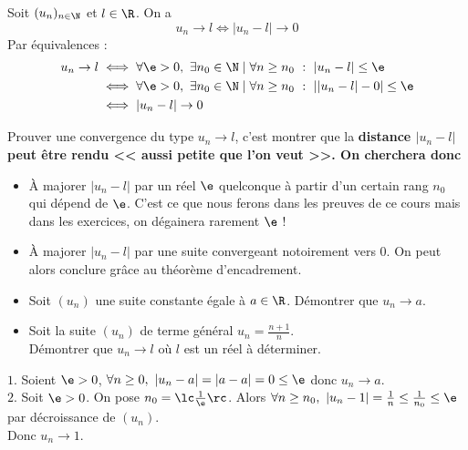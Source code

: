 \documentclass[11pt]{article}
\begin{document}
\begin{prop}{}{}
    Soit $(u_n)_{n\in\N}$ et $l\in\R$. On a
    \begin{equation*}
        u_n \to l \iff |u_n - l| \to 0
    \end{equation*}
    \tcblower
    Par équivalences :
    \begin{align*}
        u_n \to l &\iff \forall \e > 0, ~ \exists n_0 \in \N \mid \forall n \geq n_0 ~ : ~ |u_n - l| \leq \e \\&\iff \forall \e > 0, ~ \exists n_0 \in \N \mid \forall n \geq n_0 ~ : ~ ||u_n - l| - 0| \leq \e \\&\iff |u_n - l| \to 0
    \end{align*}
\end{prop}

\begin{meth}{}{}
    Prouver une convergence du type $u_n\to l$, c'est montrer que la \bf{distance} $|u_n-l|$ peut être rendu << aussi petite que l'on veut >>. On cherchera donc
    \begin{itemize}
        \item À majorer $|u_n - l|$ par un réel $\e$ quelconque à partir d'un certain rang $n_0$ qui dépend de $\e$. C'est ce que nous ferons dans les preuves de ce cours mais dans les exercices, on dégainera rarement $\e$ !
        \item À majorer $|u_n - l|$ par une suite convergeant notoirement vers 0. On peut alors conclure grâce au théorème d'encadrement.
    \end{itemize}
\end{meth}

\begin{ex}{}{}
    \begin{itemize}
        \item Soit $(u_n)$ une suite constante égale à $a\in\R$. Démontrer que $u_n\to a$.
        \item Soit la suite $(u_n)$ de terme général $u_n=\frac{n+1}{n}$.\\
        Démontrer que $u_n\to l$ où $l$ est un réel à déterminer.
    \end{itemize}
    \tcblower
    $\boxed{1.}$ Soient $\e>0$, $\forall n \geq 0, ~ |u_n - a| = |a - a| = 0 \leq \e$ donc $u_n\to a$.\\
    $\boxed{2.}$ Soit $\e>0$. On pose $n_0=\lc\frac{1}{\e}\rc$. Alors $\forall n \geq n_0, ~ |u_n - 1| = \frac{1}{n}\leq\frac{1}{n_0}\leq\e$ par décroissance de $(u_n)$.\\
    Donc $u_n\to 1$. 
\end{ex}
\end{document}
